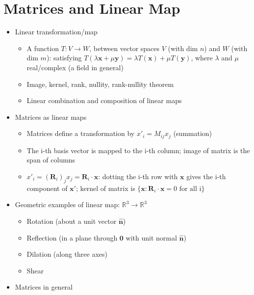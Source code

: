 \section{Matrices and Linear Map}
\begin{itemize}
      \item Linear transformation/map
            \begin{itemize}
                  \item A function $T:V\to W$, between vector spaces $V$ (with dim $n$)
                        and $W$ (with dim $m$): satisfying $T(\lambda\mathbf{x}+\mu\mathbf{y})=\lambda T(\mathbf{x})+\mu T(\mathbf{y})$,
                        where $\lambda$ and $\mu$ real/complex (a field in general)
                  \item Image, kernel, rank, nullity, rank-nullity theorem
                  \item Linear combination and composition of linear maps
            \end{itemize}
      \item Matrices as linear maps
            \begin{itemize}
                  \item Matrices define a transformation by $x'_{i}=M_{ij}x_{j}$ (summation)
                  \item The i-th basis vector is mapped to the i-th column; image of matrix
                        is the span of columns
                  \item $x'_{i}=(\mathbf{R}_{i})_{j}x_{j}=\mathbf{R}_{i}\cdot\mathbf{x}$:
                        dotting the i-th row with $\mathbf{x}$ gives the i-th component of
                        $\mathbf{x'}$; kernel of matrix is $\{\mathbf{x}:\mathbf{R}_{i}\cdot\mathbf{x}=0\textrm{ for all i}\}$
            \end{itemize}
      \item Geometric examples of linear map: $\mathbb{R}^{3}\to\mathbb{R}^{3}$
            \begin{itemize}
                  \item Rotation (about a unit vector $\mathbf{\hat{n}}$)
                  \item Reflection (in a plane through $\mathbf{0}$ with unit normal $\mathbf{\hat{n}}$)
                  \item Dilation (along three axes)
                  \item Shear
            \end{itemize}
      \item Matrices in general

\end{itemize}
